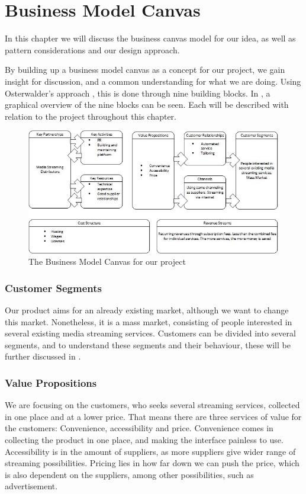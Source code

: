 \section{Business Model Canvas}
\label{sec:business_canvas}
In this chapter we will discuss the business canvas model for our idea, as well as pattern considerations and our design approach.

By building up a business model canvas as a concept for our project, we gain insight for discussion, and a common understanding for what we are doing. Using Osterwalder's approach \cite[p. 1-51]{canvas}, this is done through nine building blocks. In , a graphical overview of the nine blocks can be seen. Each will be described with relation to the project throughout this chapter.

\begin{figure}[h]
    \begin{center}
        \includegraphics[scale=0.8]{./pics/model_canvas}
        \caption{The Business Model Canvas for our project}
        \label{fig:model_canvas}
    \end{center}
\end{figure}


\subsubsection*{Customer Segments}
Our product aims for an already existing market, although we want to change this market. Nonetheless, it is a mass market, consisting of people interested in several existing media streaming services. Customers can be divided into several segments, and to understand these segments and their behaviour, these will be further discussed in .

\subsubsection*{Value Propositions}
We are focusing on the customers, who seeks several streaming services, collected in one place and at a lower price. That means there are three services of value for the customers: Convenience, accessibility and price. Convenience comes in collecting the product in one place, and making the interface painless to use. Accessibility is in the amount of suppliers, as more suppliers give wider range of streaming possibilities. Pricing lies in how far down we can push the price, which is also dependent on the suppliers, among other possibilities, such as advertisement.

